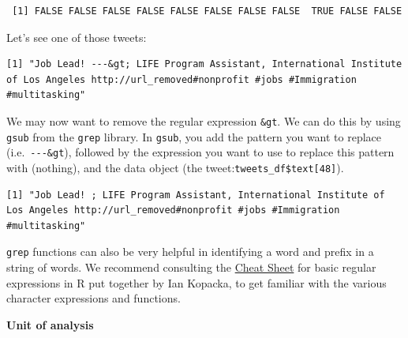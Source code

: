 \documentclass[
  letterpaper,
  DIV=11,
  numbers=noendperiod]{scrreprt}
\newenvironment{Shaded}{\begin{snugshade}}{\end{snugshade}}
\newcommand{\DecValTok}[1]{\textcolor[rgb]{0.68,0.00,0.00}{#1}}
\newcommand{\FunctionTok}[1]{\textcolor[rgb]{0.28,0.35,0.67}{#1}}
\newcommand{\NormalTok}[1]{\textcolor[rgb]{0.00,0.23,0.31}{#1}}
\newcommand{\SpecialCharTok}[1]{\textcolor[rgb]{0.37,0.37,0.37}{#1}}
\newcommand{\StringTok}[1]{\textcolor[rgb]{0.13,0.47,0.30}{#1}}
\begin{document}
\begin{verbatim}
 [1] FALSE FALSE FALSE FALSE FALSE FALSE FALSE FALSE  TRUE FALSE FALSE
\end{verbatim}

Let's see one of those tweets:

\begin{Shaded}
\end{Shaded}

\begin{verbatim}
[1] "Job Lead! ---&gt; LIFE Program Assistant, International Institute of Los Angeles http://url_removed#nonprofit #jobs #Immigration #multitasking"
\end{verbatim}

We may now want to remove the regular expression \texttt{\&gt}. We can
do this by using \texttt{gsub} from the \texttt{grep} library. In
\texttt{gsub}, you add the pattern you want to replace
(i.e.~\texttt{-\/-\/-\&gt}), followed by the expression you want to use
to replace this pattern with (nothing), and the data object (the
tweet:\texttt{tweets\_df\$text{[}48{]}}).

\begin{Shaded}
\end{Shaded}

\begin{verbatim}
[1] "Job Lead! ; LIFE Program Assistant, International Institute of Los Angeles http://url_removed#nonprofit #jobs #Immigration #multitasking"
\end{verbatim}

\texttt{grep} functions can also be very helpful in identifying a word
and prefix in a string of words. We recommend consulting the
\href{https://github.com/rstudio/cheatsheets/blob/main/regex.pdf}{Cheat
Sheet} for basic regular expressions in R put together by Ian Kopacka,
to get familiar with the various character expressions and functions.

\textbf{Unit of analysis}
\end{document}
